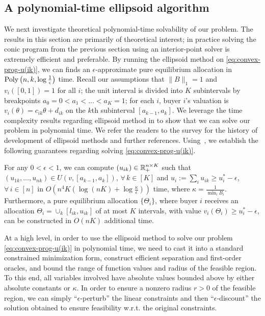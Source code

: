 \subsection{A polynomial-time ellipsoid algorithm} \label{subsec:compute-pure-eq-alloc-poly-time}
We next investigate theoretical polynomial-time solvability of our problem.
The results in this section are primarily of theoretical interest; in practice solving the conic program from the previous section using an interior-point solver is extremely efficient and preferable. By running the ellipsoid method on \eqref{eq:convex-prog-u(ik)}, we can finds an $\epsilon$-approximate pure equilibrium allocation in $\textnormal{Poly}\left(n,k,\log \frac{1}{\epsilon}\right)$ time. 
Recall our assumptions that $\|B\|_1 = 1$ and $v_i([0,1]) = 1$ for all $i$; the unit interval is divided into $K$ subintervals by breakpoints $a_0 = 0 < a_1 < \dots < a_K = 1$; for each $i$, buyer $i$'s valuation is $v_i(\theta) = c_{ik}\theta+d_{ik}$ on the $k$th subinterval $[a_{k-1}, a_k]$. We leverage the time complexity results regarding ellipsoid method in \citep[\S 4.1.4]{ben2019lectures} to show that we can solve our problem in polynomial time.
We refer the readers to the survey \citep{bland1981ellipsoid} for the history of development of ellipsoid methods and further references.
Using~\cite[Theorem 4.1.2]{ben2019lectures}, we establish the following guarantees regarding solving \eqref{eq:convex-prog-u(ik)}.
\begin{theorem}
	For any $0 < \epsilon < 1$, we can compute $(u_{ik})\in \mathbb{R}_+^{n\times K}$ such that $(u_{1k}, \dots, u_{nk})\in U(v, [a_{k-1}, a_k])$, $\forall\, k\in [K]$ and $u_i := \sum_i u_{ik} \geq u^*_i - \epsilon$, $\forall\, i \in [n]$
	in $O\left( n^4 K \left( \log(nK) + \log \frac{\kappa}{\epsilon} \right) \right)$ time, where $\kappa = \frac{1}{\min_i B_i}$.
	Furthermore, a pure equilibrium allocation $\{\Theta_i\}$, where buyer $i$ receives an allocation $\Theta_i = \cup_k [l_{ik}, u_{ik}]$ of at most $K$ intervals,
	with value $v_i(\Theta_i) \geq u^*_i - \epsilon$,
	can be constructed in $O(nK)$ additional time. 
	\label{thm:ellipsoid-method-for-u(ik)-convex-program}
\end{theorem}
At a high level, in order to use the ellipsoid method to solve our problem \eqref{eq:convex-prog-u(ik)} in polynomial time, we need to cast it into a standard constrained minimization form, construct efficient separation and first-order oracles, and bound the range of function values and radius of the feasible region. 
To this end, all variables involved have absolute values bounded above by either absolute constants or $\kappa$. In order to ensure a nonzero radius $r>0$ of the feasible region, we can simply ``$\epsilon$-perturb'' the linear constraints and then ``$\epsilon$-discount'' the solution obtained to ensure feasibility w.r.t. the original constraints.

